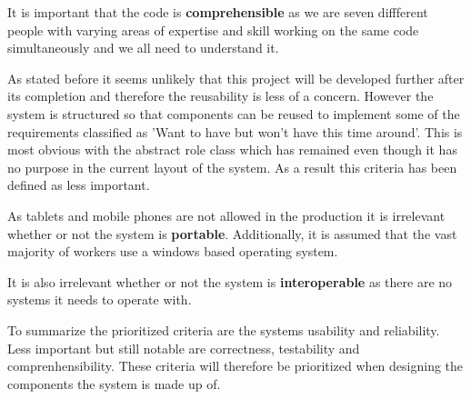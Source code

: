 It is important that the code is \textbf{comprehensible} as we are seven diffferent people with varying areas of expertise and skill working on the same code simultaneously and we all need to understand it.

As stated before it seems unlikely that this project will be developed further after its completion and therefore the reusability is less of a concern. However the system is structured so that components can be reused to implement some of the requirements classified as 'Want to have but won't have this time around'. This is most obvious with the abstract role class which has remained even though it has no purpose in the current layout of the system. As a result this criteria has been defined as less important.

As tablets and mobile phones are not allowed in the production it is irrelevant whether or not the system is \textbf{portable}. Additionally, it is assumed that the vast majority of workers use a windows based operating system.

It is also irrelevant whether or not the system is \textbf{interoperable} as there are no systems it needs to operate with.

To summarize the prioritized criteria are the systems usability and reliability. Less important but still notable are correctness, testability and comprenhensibility. These criteria will therefore be prioritized when designing the components the system is made up of.

